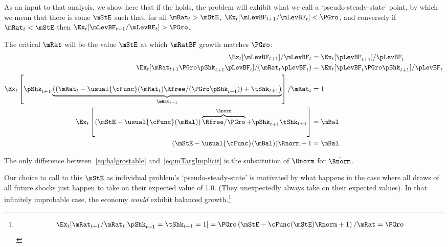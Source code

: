 \documentclass[ProjectDLO]{subfiles}
\begin{document}
As an input to that analysis, we show here that if the {\GIC} holds, the problem will exhibit what we call a `pseudo-steady-state' point, by which we mean that there is some ${\mStE}$ such that, for all $\mRat_{t}>{\mStE}$, $\Ex_{t}[\mLevBF_{t+1}/\mLevBF_{t}] < \PGro$, and conversely if $\mRat_{t}<{\mStE}$ then $\Ex_{t}[\mLevBF_{t+1}/\mLevBF_{t}] > \PGro$.  %

 \hypertarget{balgrostable}{}
 \hypertarget{balgrostableSolve}{}

 The critical $\mRat$ will be the value $\mStE$ at which $\mRatBF$ growth matches $\PGro$:
  \begin{align}
  \Ex_{t}[\mLevBF_{t+1}]/\mLevBF_{t} & =\Ex_{t}[\pLevBF_{t+1}]/\pLevBF_{t} \notag
    \\  \Ex_{t}[\mRat_{t+1}\PGro\pShk_{t+1}\pLevBF_{t}]/(\mRat_{t}\pLevBF_{t}) & =\Ex_{t}[\pLevBF_{t}\PGro\pShk_{t+1}]/\pLevBF_{t} \notag
    \\ \Ex_{t}\left[\pShk_{t+1}\underbrace{\left((\mRat_{t}-\usual{\cFunc}(\mRat_{t})\Rfree/(\PGro\pShk_{t+1}))+\tShk_{t+1}\right)}_{\mRat_{t+1}}\right]/\mRat_{t} & = 1 \notag
    \\
    \Ex_{t}\left[(\mStE-\usual{\cFunc}(\mBal))\overbrace{\Rfree/\PGro}^{\Rnorm}+\pShk_{t+1}\tShk_{t+1}\right] & = \mBal \notag
\\  (\mStE-\usual{\cFunc}(\mBal))\Rnorm+ 1 & = \mBal \label{eq:balgrostable}.
\end{align}

The only difference between~\eqref{eq:balgrostable} and~\eqref{eq:mTargImplicit} is the substitution of $\Rnorm$ for $\bar{\Rnorm}$.

Our choice to call to this $\mStE$ as individual problem's `pseudo-steady-state' is motivated by what happens in the case where all draws of all future shocks just happen to take on their expected value of 1.0.  (They unexpectedly always take on their expected values).  In that infinitely improbable case, the economy \textit{would} exhibit balanced growth.\footnote{    \begin{align*}      \Ex_{t}[\mRat_{t+1}/\mRat_{t}|\pShk_{t+1}=\tShk_{t+1}=1] = \PGro \left(\mStE-\cFunc(\mStE)\Rnorm + 1 \right)/\mRat = \PGro    \end{align*}}
\end{document}

